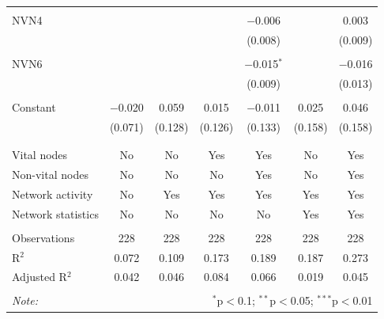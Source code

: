 \begin{table}[!htbp]
\begin{tabular}{@{\extracolsep{5pt}}lcccccc}
  & & & & & & \\ 
 NVN4 &  &  &  & $-$0.006 &  & 0.003 \\ 
  &  &  &  & (0.008) &  & (0.009) \\ 
  & & & & & & \\ 
 NVN6 &  &  &  & $-$0.015$^{*}$ &  & $-$0.016 \\ 
  &  &  &  & (0.009) &  & (0.013) \\ 
  & & & & & & \\ 
 Constant & $-$0.020 & 0.059 & 0.015 & $-$0.011 & 0.025 & 0.046 \\ 
  & (0.071) & (0.128) & (0.126) & (0.133) & (0.158) & (0.158) \\ 
  & & & & & & \\ 
\hline \\[-1.8ex] 
Vital nodes & No & No & Yes & Yes & No & Yes \\ 
Non-vital nodes & No & No & No & Yes & No & Yes \\ 
Network activity & No & Yes & Yes & Yes & Yes & Yes \\ 
Network statistics & No & No & No & No & Yes & Yes \\ 
\hline &  &  &  &  &  &  \\ 
Observations & 228 & 228 & 228 & 228 & 228 & 228 \\ 
R$^{2}$ & 0.072 & 0.109 & 0.173 & 0.189 & 0.187 & 0.273 \\ 
Adjusted R$^{2}$ & 0.042 & 0.046 & 0.084 & 0.066 & 0.019 & 0.045 \\ 
\hline 
\hline \\[-1.8ex] 
\textit{Note:}  & \multicolumn{6}{r}{$^{*}$p$<$0.1; $^{**}$p$<$0.05; $^{***}$p$<$0.01} \\ 
\end{tabular} 
\end{table} 
